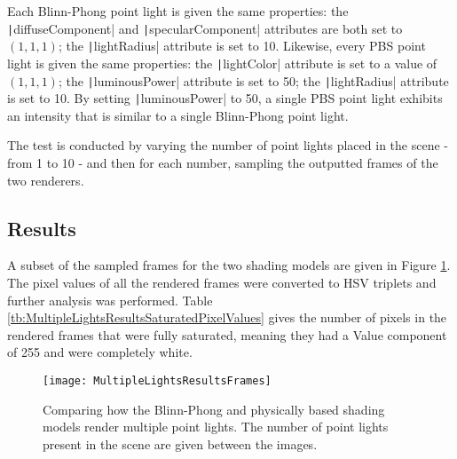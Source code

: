 Each Blinn-Phong point light is given the same properties: the \texttt|diffuseComponent| and \texttt|specularComponent| attributes are both set to \begin{math}(1, 1, 1)\end{math}; the \texttt|lightRadius| attribute is set to 10. Likewise, every PBS point light is given the same properties: the \texttt|lightColor| attribute is set to a value of \begin{math}(1, 1, 1)\end{math}; the \texttt|luminousPower| attribute is set to 50; the \texttt|lightRadius| attribute is set to 10. By setting \texttt|luminousPower| to 50, a single PBS point light exhibits an intensity that is similar to a single Blinn-Phong point light.

The test is conducted by varying the number of point lights placed in the scene - from 1 to 10 - and then for each number, sampling the outputted frames of the two renderers.

\subsection{Results}

A subset of the sampled frames for the two shading models are given in Figure \ref{fig:MultipleLightsResultsFrames}. The pixel values of all the rendered frames were converted to HSV triplets and further analysis was performed. Table \ref{tb:MultipleLightsResultsSaturatedPixelValues} gives the number of pixels in the rendered frames that were fully saturated, meaning they had a Value component of 255 and were completely white.

\begin{figure}[h]
	\centering
	\texttt{[image: MultipleLightsResultsFrames]}
	\caption{Comparing how the Blinn-Phong and physically based shading models render multiple point lights. The number of point lights present in the scene are given between the images.}
	\label{fig:MultipleLightsResultsFrames}
\end{figure}

